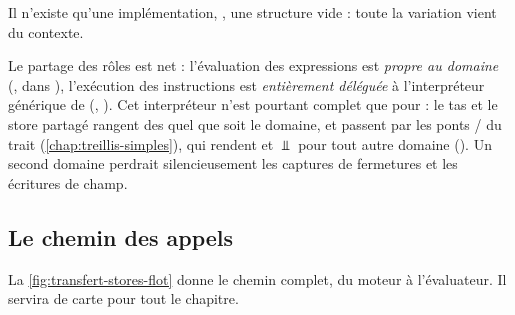 Il n'existe qu'une implémentation, , une structure
vide : toute la variation vient du contexte.


Le partage des rôles est net : l'évaluation des expressions est
\emph{propre au domaine} (, dans ),
l'exécution des instructions est \emph{entièrement déléguée} à
l'interpréteur générique de 
(, ). Cet
interpréteur n'est pourtant complet que pour  : le tas et le
store partagé rangent des  quel que soit le domaine, et
passent par les ponts  /  du
trait  (\cref{chap:treillis-simples}), qui rendent
 et $\Bot$ pour tout autre domaine
(). Un second domaine perdrait
silencieusement les captures de fermetures et les écritures de champ.

\subsection{Le chemin des appels}

La \cref{fig:transfert-stores-flot} donne le chemin complet, du moteur à
l'évaluateur. Il servira de carte pour tout le chapitre.

